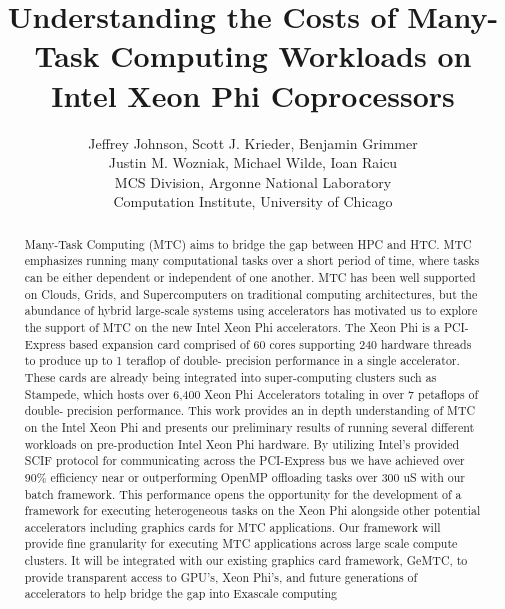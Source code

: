 \documentclass[conference]{IEEEtran}
\begin{document}
%
\title{Understanding the Costs of Many-Task Computing Workloads on Intel Xeon Phi Coprocessors}


\author{Jeffrey Johnson,
Scott J. Krieder,
Benjamin Grimmer\\
Justin M. Wozniak,
Michael Wilde,
Ioan Raicu\\
MCS Division, Argonne National Laboratory\\
Computation Institute, University of Chicago
}


\maketitle


\begin{abstract}
Many-Task Computing (MTC) aims to bridge the gap between HPC and HTC. MTC emphasizes running many computational tasks over a short period of time, where tasks can be either dependent or independent of one another. MTC has been well supported on Clouds, Grids, and Supercomputers on traditional computing architectures, but the abundance of hybrid large-scale systems using accelerators has motivated us to explore the support of MTC on the new Intel Xeon Phi accelerators. The Xeon Phi is a PCI-Express based expansion card comprised of 60 cores supporting 240 hardware threads to produce up to 1 teraflop of double- precision performance in a single accelerator. These cards are already being integrated into super-computing clusters such as Stampede, which hosts over 6,400 Xeon Phi Accelerators totaling in over 7 petaflops of double- precision performance. This work provides an in depth understanding of MTC on the Intel Xeon Phi and presents our preliminary results of running several different workloads on pre-production Intel Xeon Phi hardware. By utilizing Intel's provided SCIF protocol for communicating across the PCI-Express bus we have achieved over 90\% efficiency near or outperforming OpenMP offloading tasks over 300 uS with our batch framework. This performance opens the opportunity for the development of a framework for executing heterogeneous tasks on the Xeon Phi alongside other potential accelerators including graphics cards for MTC applications. Our framework will provide fine granularity for executing MTC applications across large scale compute clusters. It will be integrated with our existing graphics card framework, GeMTC, to provide transparent access to GPU’s, Xeon Phi’s, and future generations of accelerators to help bridge the gap into Exascale computing
\end{abstract}
\end{document}
